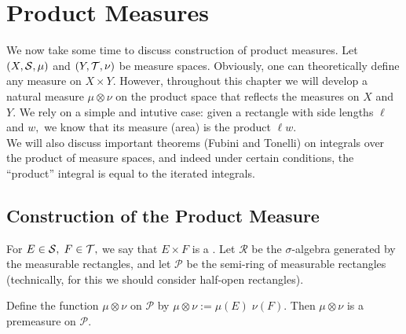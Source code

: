 
\newcommand{\RR}[0]{\mathcal{R}}
\newcommand{\PP}[0]{\mathcal{P}}
\newcommand{\mn}[0]{\mu\otimes\nu}

\chapter{Product Measures}
We now take some time to discuss construction of product measures. Let $(X,\mathcal{S},\mu)$ and $(Y,\mathcal{T},\nu)$ be measure spaces. Obviously, one can theoretically define any measure on $X\times Y.$ However, throughout this chapter we will develop a natural measure $\mu\otimes\nu$ on the product space that reflects the measures on $X$ and $Y.$ We rely on a simple and intutive case: given a rectangle with side lengths $\ell$ and $w,$ we know that its measure (area) is the product $\ell w.$ \\

\noindent We will also discuss important theorems (Fubini and Tonelli) on integrals over the product of measure spaces, and indeed under certain conditions, the ``product'' integral is equal to the iterated integrals.

\section{Construction of the Product Measure}
\noindent For $E\in\mathcal{S},$ $F\in\mathcal{T},$ we say that $E\times F$ is a . Let $\RR$ be the $\sigma$-algebra generated by the measurable rectangles, and let $\PP$ be the semi-ring of measurable rectangles (technically, for this we should consider half-open rectangles).

\begin{prop}
Define the function $\mn$ on $\PP$ by $\mn:=\mu(E)\;\nu(F).$ Then $\mn$ is a premeasure on $\PP.$ \\
\end{prop}

